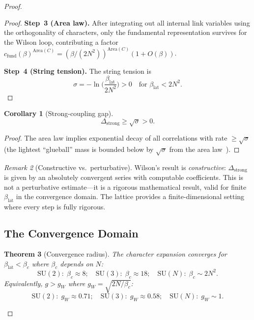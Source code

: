 \documentclass[12pt,a4paper]{article}
\theoremstyle{plain}
\newtheorem{theorem}{Theorem}[section]
\newtheorem{corollary}[theorem]{Corollary}
\theoremstyle{definition}
\theoremstyle{remark}
\newtheorem{remark}[theorem]{Remark}
\begin{document}
\begin{proof}
\begin{proof}
\textbf{Step~3 (Area law).} After integrating out all internal link variables using the orthogonality of characters, only the fundamental representation survives for the Wilson loop, contributing a factor $c_{\mathrm{fund}}(\beta)^{\mathrm{Area}(C)}=(\beta/(2N^2))^{\mathrm{Area}(C)}(1+O(\beta))$.

\textbf{Step~4 (String tension).} The string tension is
\begin{equation}\label{eq:sigma}
\sigma = -\ln\!\Big(\frac{\beta_{\mathrm{lat}}}{2N^2}\Big) > 0 \quad\text{for }\beta_{\mathrm{lat}}<2N^2.
\end{equation}
\end{proof}

\begin{corollary}[Strong-coupling gap]\label{cor:stronggap}
\begin{equation}\label{eq:stronggap}
\Delta_{\mathrm{strong}} \geq \sqrt{\sigma} > 0.
\end{equation}
\end{corollary}

\begin{proof}
The area law implies exponential decay of all correlations with rate $\geq\sqrt{\sigma}$ (the lightest ``glueball'' mass is bounded below by $\sqrt{\sigma}$ from the area law~\cite{Wilson1974}).
\end{proof}

\begin{remark}[Constructive vs.\ perturbative]\label{rem:constructive}
Wilson's result is \emph{constructive}: $\Delta_{\mathrm{strong}}$ is given by an absolutely convergent series with computable coefficients. This is not a perturbative estimate---it is a rigorous mathematical result, valid for finite $\beta_{\mathrm{lat}}$ in the convergence domain. The lattice provides a finite-dimensional setting where every step is fully rigorous.
\end{remark}

\subsection{The Convergence Domain}\label{sec:domain}

\begin{theorem}[Convergence radius]\label{thm:radius}
The character expansion converges for $\beta_{\mathrm{lat}}<\beta_c$ where $\beta_c$ depends on $N$:
\begin{equation}\label{eq:betac}
\mathrm{SU}(2):\;\beta_c\approx 8;\quad
\mathrm{SU}(3):\;\beta_c\approx 18;\quad
\mathrm{SU}(N):\;\beta_c\sim 2N^2.
\end{equation}
Equivalently, $g>g_W$ where $g_W=\sqrt{2N/\beta_c}$:
\begin{equation}\label{eq:gW}
\mathrm{SU}(2):\;g_W\approx 0.71;\quad
\mathrm{SU}(3):\;g_W\approx 0.58;\quad
\mathrm{SU}(N):\;g_W\sim 1.
\end{equation}
\end{theorem}


\end{proof}
\end{document}
